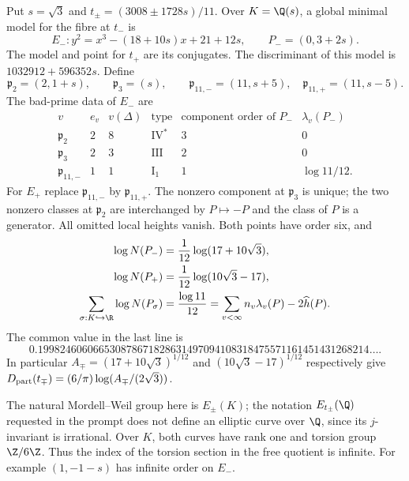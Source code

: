 \begin{statement}
Put $s=\sqrt3$ and
$t_\pm=(3008\pm1728s)/11$. Over $K=\Q(s)$, a global minimal
model for the fibre at $t_-$ is
\[
 E_-:y^2=x^3-(18+10s)x+21+12s,\qquad P_-=(0,3+2s).
\]
The model and point for $t_+$ are its conjugates. The
discriminant of this model is $1032912+596352s$. Define
\[
 \mathfrak p_2=(2,1+s),\qquad\mathfrak p_3=(s),\qquad
 \mathfrak p_{11,-}=(11,s+5),\quad
 \mathfrak p_{11,+}=(11,s-5).
\]
The bad-prime data of $E_-$ are
\[
\begin{array}{c|c|c|c|c|c}
v&e_v&v(\Delta)&\text{type}&\text{component order of }P_-&\lambda_v(P_-)\\\hline
\mathfrak p_2&2&8&\mathrm{IV}^*&3&0\\
\mathfrak p_3&2&3&\mathrm{III}&2&0\\
\mathfrak p_{11,-}&1&1&\mathrm I_1&1&\log11/12.
\end{array}
\]
For $E_+$ replace $\mathfrak p_{11,-}$ by
$\mathfrak p_{11,+}$. The nonzero component at
$\mathfrak p_3$ is unique; the two nonzero classes at
$\mathfrak p_2$ are interchanged by $P\mapsto-P$ and the
class of $P$ is a generator. All omitted local heights vanish.
Both points have order six, and
\begin{align*}
 \log N(P_-)&=\frac1{12}\log(17+10\sqrt3),\\
 \log N(P_+)&=\frac1{12}\log(10\sqrt3-17),\\
 \sum_{\sigma:K\hookrightarrow\R}\log N(P_\sigma)
 &=\frac{\log11}{12}
 =\sum_{v<\infty}n_v\lambda_v(P)-2\widehat h(P).
\end{align*}
The common value in the last line is
\[
 0.199824606066530878671828631497094108318475571161451431268214\ldots.
\]
In particular $A_\mp=(17+10\sqrt3)^{1/12}$ and
$(10\sqrt3-17)^{1/12}$ respectively give
$D_{\rm part}(t_\mp)=(6/\pi)\log(A_\mp/(2\sqrt3))$.

The natural Mordell--Weil group here is $E_\pm(K)$; the
notation $E_{t_\pm}(\Q)$ requested in the prompt does not
define an elliptic curve over $\Q$, since its $j$-invariant
is irrational. Over $K$, both curves have rank one and torsion
group $\Z/6\Z$. Thus the index of the torsion section in the
free quotient is infinite. For example $(1,-1-s)$ has infinite
order on $E_-$.
\end{statement}
